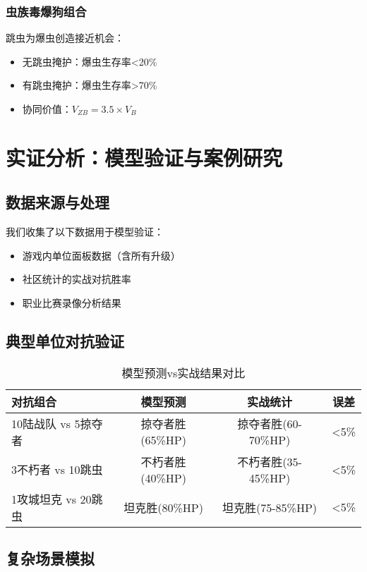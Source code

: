 \documentclass[a4paper,12pt]{article}
\begin{document}
\begin{CJK}{UTF8}{gbsn}
\subsubsection{虫族毒爆狗组合}
跳虫为爆虫创造接近机会：
\begin{itemize}
\item 无跳虫掩护：爆虫生存率<20\%
\item 有跳虫掩护：爆虫生存率>70\%
\item 协同价值：$V_{ZB} = 3.5 \times V_{B}$
\end{itemize}

\section{实证分析：模型验证与案例研究}

\subsection{数据来源与处理}
我们收集了以下数据用于模型验证：
\begin{itemize}
\item 游戏内单位面板数据（含所有升级）
\item 社区统计的实战对抗胜率
\item 职业比赛录像分析结果
\end{itemize}

\subsection{典型单位对抗验证}

\begin{table}[h]
\centering
\caption{模型预测vs实战结果对比}
\begin{tabular}{lccc}
\toprule
\textbf{对抗组合} & \textbf{模型预测} & \textbf{实战统计} & \textbf{误差} \\
\midrule
10陆战队 vs 5掠夺者 & 掠夺者胜(65\%HP) & 掠夺者胜(60-70\%HP) & <5\% \\
3不朽者 vs 10跳虫 & 不朽者胜(40\%HP) & 不朽者胜(35-45\%HP) & <5\% \\
1攻城坦克 vs 20跳虫 & 坦克胜(80\%HP) & 坦克胜(75-85\%HP) & <5\% \\
\bottomrule
\end{tabular}
\end{table}

\subsection{复杂场景模拟}


\end{CJK}
\end{document}
